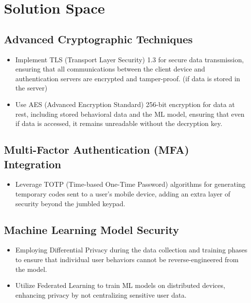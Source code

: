 \documentclass{article}
\begin{document}
\section*{Solution Space}

\subsection*{Advanced Cryptographic Techniques}
\begin{itemize}[label=--,leftmargin=*]
    \item Implement TLS (Transport Layer Security) 1.3 for secure data transmission, ensuring that all communications between the client device and authentication servers are encrypted and tamper-proof. (if data is stored in the server)
    \item Use AES (Advanced Encryption Standard) 256-bit encryption for data at rest, including stored behavioral data and the ML model, ensuring that even if data is accessed, it remains unreadable without the decryption key.
\end{itemize}

\subsection*{Multi-Factor Authentication (MFA) Integration}
\begin{itemize}[label=--,leftmargin=*]
    \item Leverage TOTP (Time-based One-Time Password) algorithms for generating temporary codes sent to a user's mobile device, adding an extra layer of security beyond the jumbled keypad.
\end{itemize}

\subsection*{Machine Learning Model Security}
\begin{itemize}[label=--,leftmargin=*]
    \item Employing Differential Privacy during the data collection and training phases to ensure that individual user behaviors cannot be reverse-engineered from the model.
    \item Utilize Federated Learning to train ML models on distributed devices, enhancing privacy by not centralizing sensitive user data.
\end{itemize}
\end{document}
